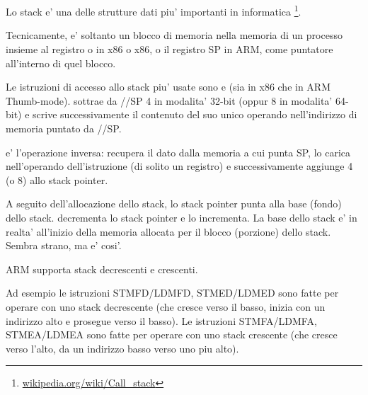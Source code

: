 \chapter{\Stack}
\label{sec:stack}
\myindex{\Stack}

Lo stack e' una delle strutture dati piu' importanti in informatica
\footnote{\href{http://go.yurichev.com/17119}{wikipedia.org/wiki/Call\_stack}}.

Tecnicamente, e' soltanto un blocco di memoria nella memoria di un processo insieme al registro \ESP o \RSP in x86 o x86, o il registro \ac{SP} in ARM, come puntatore all'interno di quel blocco.

Le istruzioni di accesso allo stack piu' usate sono \PUSH e \POP (sia in x86 che in ARM Thumb-mode).
\PUSH sottrae da \ESP/\RSP/\ac{SP} 4 in modalita' 32-bit (oppur 8 in modalita' 64-bit) e scrive successivamente il contenuto del suo unico operando nell'indirizzo di memoria puntato da \ESP/\RSP/\ac{SP}.

\POP e' l'operazione inversa: recupera il dato dalla memoria a cui punta \ac{SP}, lo carica nell'operando dell'istruzione (di solito un registro)
e successivamente aggiunge 4 (o 8) allo \gls{stack pointer}.

A seguito dell'allocazione dello stack, lo \gls{stack pointer} punta alla base (fondo) dello stack.
\PUSH decrementa lo \gls{stack pointer} e \POP lo incrementa.
La base dello stack e' in realta' all'inizio della memoria allocata per il blocco (porzione) dello stack. Sembra strano, ma e' cosi'.

ARM supporta stack decrescenti e crescenti.


Ad esempio le istruzioni \ac{STMFD}/\ac{LDMFD}, \ac{STMED}/\ac{LDMED} sono fatte per operare con uno stack decrescente (che cresce verso il basso, inizia con un indirizzo alto e prosegue verso il basso).
Le istruzioni \ac{STMFA}/\ac{LDMFA}, \ac{STMEA}/\ac{LDMEA} sono fatte per operare con uno stack crescente (che cresce verso l'alto, da un indirizzo basso verso uno piu alto).


